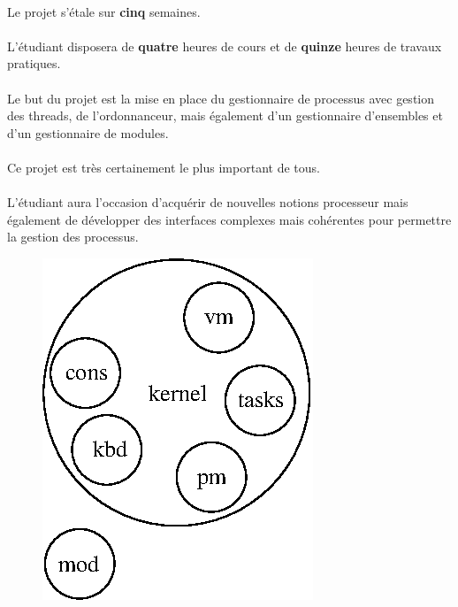 \documentclass[10pt,a4wide]{article}
\begin{document}
\paragraph{}

Le projet s'\'etale sur \textbf{cinq} semaines.

\paragraph{}

L'\'etudiant disposera de \textbf{quatre} heures de cours et de \textbf{quinze}
heures de travaux pratiques.

\paragraph{}

Le but du projet est la mise en place du gestionnaire de processus avec
gestion des threads, de l'ordonnanceur, mais \'egalement d'un gestionnaire
d'ensembles et d'un gestionnaire de modules.

\paragraph{}

Ce projet est tr\`es certainement le plus important de tous.

\paragraph{}

L'\'etudiant aura l'occasion d'acqu\'erir de nouvelles notions processeur
mais \'egalement de d\'evelopper des interfaces complexes mais coh\'erentes
pour permettre la gestion des processus.

\vspace{5cm}

\begin{figure}[h]
\centerline{\includegraphics{figures/k4.eps}}
\end{figure}
\end{document}
